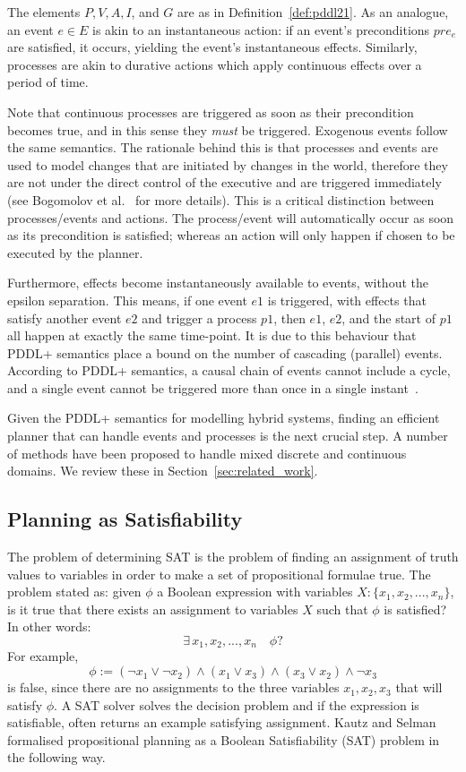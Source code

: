 The elements $P,V,A,I$, and $G$ are as in Definition~\ref{def:pddl21}. As an analogue, an event $e\in E$ is akin to an instantaneous action: if an event's preconditions $pre_e$ are satisfied, it occurs, yielding the event's instantaneous effects. Similarly, processes are akin to durative actions which apply continuous effects over a period of time.

Note that continuous processes are triggered as soon as their precondition becomes true, and in this sense they \textit{must} be triggered. Exogenous events follow the same semantics. The rationale behind this is that processes and events are used to model changes that are initiated by changes in the world, therefore they are not under the direct control of the executive and are triggered immediately (see Bogomolov et al.~\cite{bogomolov14} for more details). This is a critical distinction between processes/events and actions. The process/event will automatically occur as soon as its precondition is satisfied; whereas an action will only happen if chosen to be executed by the planner.

Furthermore, effects become instantaneously available to events, without the epsilon separation. This means, if one event $e1$ is triggered, with effects that satisfy another event $e2$ and trigger a process $p1$, then $e1$, $e2$, and the start of $p1$ all happen at exactly the same time-point. It is due to this behaviour that PDDL+ semantics place a bound on the number of cascading (parallel) events. According to PDDL+ semantics, a causal chain of events cannot include a cycle, and a single event cannot be triggered more than once in a single instant~\cite{fox2002pddl+}.

Given the PDDL+ semantics for modelling hybrid systems, finding an efficient planner that can handle events and processes is the next crucial step. A number of methods have been proposed to handle mixed discrete and continuous domains. We review these in Section~\ref{sec:related_work}.

\subsection{Planning as Satisfiability}

The problem of determining SAT is the problem of finding an assignment of truth values to variables in order to make a set of propositional formulae true. The problem stated as: given $\phi$ a Boolean expression with variables $X: \{ x_1, x_2, ... , x_n\}$, is it true that there exists an assignment to variables $X$ such that $\phi$ is satisfied? In other words:
$$
\exists \, x_1, x_2, ... , x_n \quad\phi?
$$
For example,
$$
\phi := (\neg x_1 \vee \neg x_2) \wedge (x_1 \vee x_3) \wedge (x_3 \vee x_2) \wedge \neg x_3
$$
is false, since there are no assignments to the three variables $x_1, x_2, x_3$ that will satisfy $\phi$.
%
A SAT solver solves the decision problem and if the expression is satisfiable, often returns an example satisfying assignment. Kautz and Selman~\cite{kau92} formalised propositional planning as a Boolean Satisfiability (SAT) problem in the following way.

